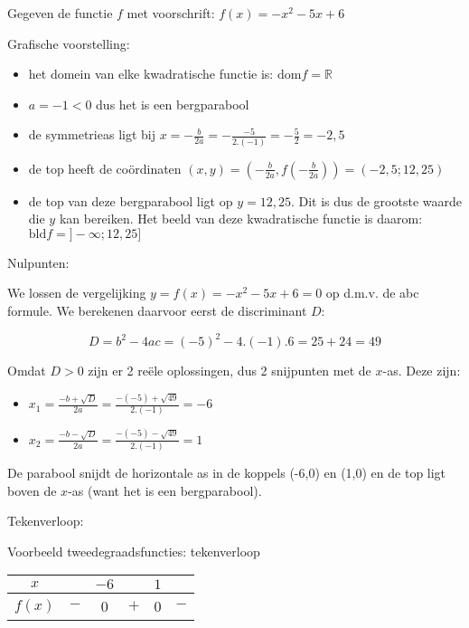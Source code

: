 \begin{voorbeeld}
	Gegeven de functie $f$ met voorschrift: $f(x)=-x^{2}-5x+6$ 

Grafische voorstelling:
\begin{itemize}
\item het domein van elke kwadratische functie is: $\textrm{dom}f=\mathbb{R}$
\item $a=-1<0$ dus het is een bergparabool
\item de symmetrieas ligt bij $x=-\frac{b}{2a}=-\frac{-5}{2.(-1)}=-\frac{5}{2}=-2,5$
\item de top heeft de co\"ordinaten $(x,y)=(-\frac{b}{2a},f(-\frac{b}{2a}))=(-2,5;12,25)$
\item de top van deze bergparabool ligt op $y=12,25$. Dit is dus de grootste
waarde die $y$ kan bereiken. Het beeld van deze kwadratische functie
is daarom: $\textrm{bld}f=]-\infty;12,25]$
\end{itemize}


Nulpunten:

We lossen de vergelijking $y=f(x)=-x^{2}-5x+6=0$ op d.m.v.
de abc formule. We berekenen daarvoor eerst de discriminant $D$:

\begin{equation*}
D=b^{2}-4ac=(-5)^{2}-4.(-1).6=25+24=49
\end{equation*}

Omdat $D>0$ zijn er 2 re\"ele oplossingen, dus 2 snijpunten
met de $x$-as. Deze zijn:
\begin{itemize}
\item $x_{1}=\frac{-b+\sqrt{D}}{2a}=\frac{-(-5)+\sqrt{49}}{2.(-1)}=-6$
\item $x_{2}=\frac{-b-\sqrt{D}}{2a}=\frac{-(-5)-\sqrt{49}}{2.(-1)}=1$
\end{itemize}
De parabool snijdt de horizontale as in de koppels (-6,0) en (1,0)
en de top ligt boven de $x$-as (want het is een bergparabool).




Tekenverloop:


\begin{tabel}{Voorbeeld tweedegraadsfuncties: tekenverloop}
\begin{tabular}{c||c|c|c|c|c}
	$x$ &  & $-6$ &  & $1$ & \\
	\hline 
	$f(x)$ & $-$ & 0 & $+$ & 0 & $-$\\
\end{tabular}
\label{tab:tweede:vb}	
\end{tabel}

\end{voorbeeld}